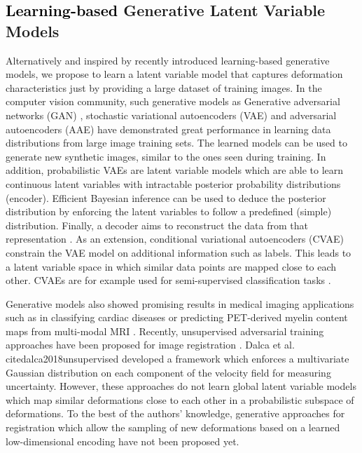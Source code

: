 \documentclass[journal]{IEEEtran}
\newcommand{\update}[1]{\textcolor{black}{#1}}
\begin{document}
\subsection{\update{Learning-based} Generative Latent Variable Models}
Alternatively and inspired by recently introduced learning-based generative models, we propose to learn a latent variable model that captures deformation characteristics just by providing a large dataset of training images. In the computer vision community, such generative models as Generative adversarial networks (GAN) \cite{goodfellow2014generative}, stochastic variational autoencoders (VAE) \cite{kingma2013auto} and adversarial autoencoders (AAE) \cite{makhzani2015adversarial} have demonstrated great performance in learning data distributions from large image training sets. The learned models can be used to generate new synthetic images, similar to the ones seen during training. In addition, probabilistic VAEs are latent variable models which are able to learn continuous latent variables with intractable posterior probability distributions (encoder). Efficient Bayesian inference can be used to deduce the posterior distribution by enforcing the latent variables to follow a predefined (simple) distribution. Finally, a decoder aims to reconstruct the data from that representation  \cite{kingma2013auto}. As an extension, conditional variational autoencoders (CVAE)  constrain the VAE model on additional information such as labels. This leads to a latent variable space in which similar data points are mapped close to each other. CVAEs are for example used for semi-supervised classification tasks \cite{kingma2014semi}. 

Generative models also showed promising results in medical imaging applications such as in classifying cardiac diseases \cite{biffi2018learning} or predicting PET-derived myelin content maps from multi-modal MRI \cite{wei2018learning}. Recently, unsupervised adversarial training approaches have been proposed for image registration \cite{mahapatra2018deformable,fan2018adversarial,tanner2018generative}. Dalca et al.\\cite{dalca2018unsupervised} developed a framework which enforces a multivariate Gaussian distribution on each component of the velocity field for measuring uncertainty. However, these approaches do not learn global latent variable models which map similar deformations close to each other in a probabilistic subspace of deformations. To the best of the authors' knowledge, generative approaches for registration which allow the sampling of new deformations based on a learned low-dimensional encoding have not been proposed yet. 
\end{document}
